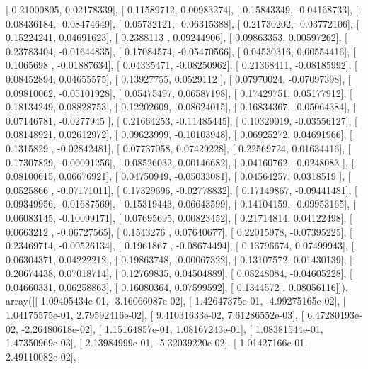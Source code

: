 \documentclass{article}
\begin{document}
       [ 0.21000805,  0.02178339],
       [ 0.11589712,  0.00983274],
       [ 0.15843349, -0.04168733],
       [ 0.08436184, -0.08474649],
       [ 0.05732121, -0.06315388],
       [ 0.21730202, -0.03772106],
       [ 0.15224241,  0.04691623],
       [ 0.2388113 ,  0.09244906],
       [ 0.09863353,  0.00597262],
       [ 0.23783404, -0.01644835],
       [ 0.17084574, -0.05470566],
       [ 0.04530316,  0.00554416],
       [ 0.1065698 , -0.01887634],
       [ 0.04335471, -0.08250962],
       [ 0.21368411, -0.08185992],
       [ 0.08452894,  0.04655575],
       [ 0.13927755,  0.0529112 ],
       [ 0.07970024, -0.07097398],
       [ 0.09810062, -0.05101928],
       [ 0.05475497,  0.06587198],
       [ 0.17429751,  0.05177912],
       [ 0.18134249,  0.08828753],
       [ 0.12202609, -0.08624015],
       [ 0.16834367, -0.05064384],
       [ 0.07146781, -0.0277945 ],
       [ 0.21664253, -0.11485445],
       [ 0.10329019, -0.03556127],
       [ 0.08148921,  0.02612972],
       [ 0.09623999, -0.10103948],
       [ 0.06925272,  0.04691966],
       [ 0.1315829 , -0.02842481],
       [ 0.07737058,  0.07429228],
       [ 0.22569724,  0.01634416],
       [ 0.17307829, -0.00091256],
       [ 0.08526032,  0.00146682],
       [ 0.04160762, -0.0248083 ],
       [ 0.08100615,  0.06676921],
       [ 0.04750949, -0.05033081],
       [ 0.04564257,  0.0318519 ],
       [ 0.0525866 , -0.07171011],
       [ 0.17329696, -0.02778832],
       [ 0.17149867, -0.09441481],
       [ 0.09349956, -0.01687569],
       [ 0.15319443,  0.06643599],
       [ 0.14104159, -0.09953165],
       [ 0.06083145, -0.10099171],
       [ 0.07695695,  0.00823452],
       [ 0.21714814,  0.04122498],
       [ 0.0663212 , -0.06727565],
       [ 0.1543276 ,  0.07640677],
       [ 0.22015978, -0.07395225],
       [ 0.23469714, -0.00526134],
       [ 0.1961867 , -0.08674494],
       [ 0.13796674,  0.07499943],
       [ 0.06304371,  0.04222212],
       [ 0.19863748, -0.00067322],
       [ 0.13107572,  0.01430139],
       [ 0.20674438,  0.07018714],
       [ 0.12769835,  0.04504889],
       [ 0.08248084, -0.04605228],
       [ 0.04660331,  0.06258863],
       [ 0.16080364,  0.07599592],
       [ 0.1344572 ,  0.08056116]]), array([[  1.09405434e-01,  -3.16066087e-02],
       [  1.42647375e-01,  -4.99275165e-02],
       [  1.04175575e-01,   2.79592416e-02],
       [  9.41031633e-02,   7.61286552e-03],
       [  6.47280193e-02,  -2.26480618e-02],
       [  1.15164857e-01,   1.08167243e-01],
       [  1.08381544e-01,   1.47350969e-03],
       [  2.13984999e-01,  -5.32039220e-02],
       [  1.01427166e-01,   2.49110082e-02],
\end{document}
